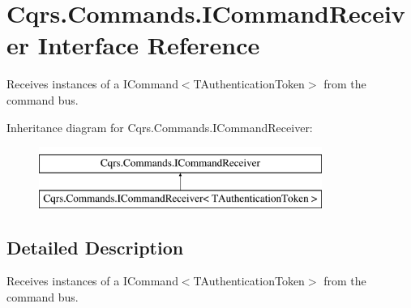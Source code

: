 \hypertarget{interfaceCqrs_1_1Commands_1_1ICommandReceiver}{}\section{Cqrs.\+Commands.\+I\+Command\+Receiver Interface Reference}
\label{interfaceCqrs_1_1Commands_1_1ICommandReceiver}


Receives instances of a I\+Command$<$\+T\+Authentication\+Token$>$ from the command bus.  


Inheritance diagram for Cqrs.\+Commands.\+I\+Command\+Receiver\+:\begin{figure}[H]
\begin{center}
\leavevmode
\includegraphics[height=2.000000cm]{interfaceCqrs_1_1Commands_1_1ICommandReceiver}
\end{center}
\end{figure}


\subsection{Detailed Description}
Receives instances of a I\+Command$<$\+T\+Authentication\+Token$>$ from the command bus. 


